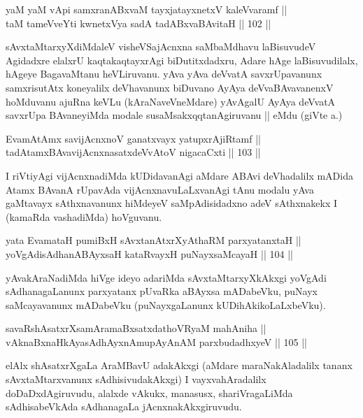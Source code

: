 \begin{shl}
yaM yaM vA\s pi samxranABxvaM tayxjatayxnetxV kaleVvaramf ||  \\
taM tameVveYti kwnetxVya sadA tadABxvaBAvitaH \hfill || 102 ||  
\end{shl}

\begin{artha}
sAvxtaMtarxyXdiMdaleV visheVSajAcnxna saMbaMdhavu laBisuvudeV
Agidadxre elalxrU kaqtakaqtayxrAgi biDutitxdadxru, Adare hAge
laBisuvudilalx, hAgeye BagavaMtanu heVLiruvanu. yAva yAva deVvatA
savxrUpavanunx samxrisutAtx koneyalilx deVhavanunx biDuvano AyAya
deVvaBAvavanenxV hoMduvanu ajuRna keVLu (kAraNaveVneMdare) yAvAgalU
AyAya deVvatA savxrUpa BAvaneyiMda modale susaMsakxqqtanAgiruvanu ||
eMdu (giVte  a.\quad) 
\end{artha}


\begin{shl}
EvamAtAmx savijAcnxnoV ganatxvayx yatupxrA\s jiRtamf || \\
tadAtamxBAvavijAcnxnasatxdeVvAtoV nigacaCxti \hfill || 103 ||  
\end{shl}

\begin{artha}
I riVtiyAgi vijAcnxnadiMda kUDidavanAgi aMdare ABAvi deVhadalilx
mADida Atamx BAvanA rUpavAda vijAcnxnavuLaLxvanAgi tAnu modalu yAva
gaMtavayx sAthxnavanunx hiMdeyeV saMpAdisidadxno adeV sAthxnakekx I
(kamaRda vashadiMda) hoVguvanu.
\end{artha}

\begin{shl}
yata EvamataH pumiBxH sAvxtanAtxrXyAthaRM parxyatanxtaH ||  \\
yoVgAdisAdhanABAyxsaH kataRvayxH puNayxsaMcayaH \hfill || 104 ||  
\end{shl}

\begin{artha}
yAvakAraNadiMda hiVge ideyo adariMda sAvxtaMtarxyXkAkxgi yoVgAdi
sAdhanagaLanunx parxyatanx pUvaRka aBAyxsa mADabeVku, puNayx
saMcayavanunx mADabeVku (puNayxgaLanunx kUDihAkikoLaLxbeVku).
\end{artha}

\begin{shl}
savaRshAsatxrXsamAramaBxsatxdathoVR\s yaM mahAniha || \\
vAknaBxnaHkAyasAdhAyxnAmupAyAnAM parxbudadhxyeV \hfill || 105 ||  
\end{shl}

\begin{artha}
elAlx shAsatxrXgaLa AraMBavU adakAkxgi (aMdare maraNakAladalilx tananx
sAvxtaMtarxvanunx sAdhisivudakAkxgi) I vayxvahAradalilx
doDaDxdAgiruvudu, alalxde vAkukx, manasusx, shariVragaLiMda
sAdhisabeVkAda sAdhanagaLa jAcnxnakAkxgiruvudu.
\end{artha}

